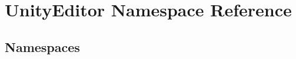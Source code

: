 \hypertarget{namespace_unity_editor}{}\section{Unity\+Editor Namespace Reference}
\label{namespace_unity_editor}
\subsection*{Namespaces}
\begin{DoxyCompactItemize}
\end{DoxyCompactItemize}
